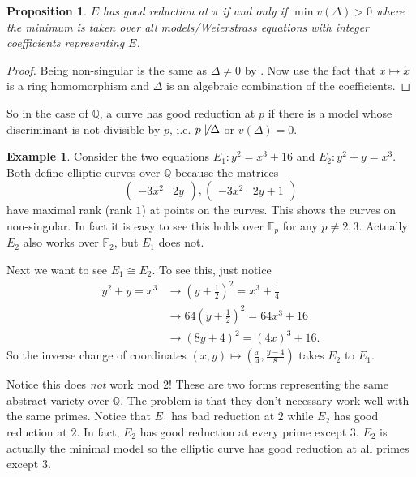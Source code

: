 \documentclass[11pt]{article}
\newcommand{\BB}[1]{\mathbb{#1}} %
\newcommand{\QQ}{\BB{Q}}
\newcommand{\FF}{\BB{F}}
\theoremstyle{plain}%
\newtheorem{prop}[thm]{Proposition}
\theoremstyle{definition}
\newtheorem{ex}[thm]{Example}
\theoremstyle{remark}
\begin{document}
\begin{prop}
	$E$ has good reduction at $\pi$ if and only if $\min v(\Delta)>0$ where the minimum is taken over all models/Weierstrass equations with integer coefficients representing $E$.
\end{prop}
\begin{proof}
	Being non-singular is the same as $\Delta\neq 0$ by \cite[Prop. III.1.4(a)]{silverman1}. Now use the fact that $x\mapsto\tilde{x}$ is a ring homomorphism and $\Delta$ is an algebraic combination of the coefficients.
\end{proof}

So in the case of $\QQ$, a curve has good reduction at $p$ if there is a model whose discriminant is not divisible by $p$, i.e. $p\not\mid\Delta$ or $v(\Delta) = 0$.

\begin{ex}
	Consider the two equations $E_1: y^2=x^3+16$ and $E_2: y^2 + y = x^3$. Both define elliptic curves over $\QQ$ because the matrices
	$$
	\begin{pmatrix}
		-3x^2 & 2y
	\end{pmatrix}
	,
	\begin{pmatrix}
		-3x^2 & 2y+1
	\end{pmatrix}
	$$
	have maximal rank (rank $1$) at points on the curves. This shows the curves on non-singular. In fact it is easy to see this holds over $\FF_p$ for any $p\neq 2,3$. Actually $E_2$ also works over $\FF_2$, but $E_1$ does not.
	
	Next we want to see $E_1\cong E_2$. To see this, just notice
	\begin{align*}
		y^2 + y = x^3
		&\to
		\left(y+\frac{1}{2}\right)^2 = x^3 + \frac{1}{4}
		\\
		&\to
		64\left(y+\frac{1}{2}\right)^2 = 64x^3 + 16
		\\
		&\to
		\left(8y+4\right)^2 = (4x)^3 + 16.
	\end{align*}
	So the inverse change of coordinates $(x,y)\mapsto \left(\frac{x}{4},\frac{y-4}{8}\right)$ takes $E_2$ to $E_1$.
	
	Notice this does \emph{not} work mod $2$! These are two forms representing the same abstract variety over $\QQ$. The problem is that they don't necessary work well with the same primes. Notice that $E_1$ has bad reduction at $2$ while $E_2$ has good reduction at $2$. In fact, $E_2$ has good reduction at every prime except $3$. $E_2$ is actually the minimal model so the elliptic curve has good reduction at all primes except $3$.
\end{ex}
\end{document}
